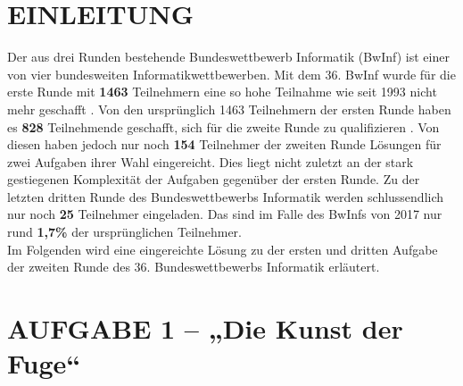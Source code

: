 \documentclass[a4paper,12pt]{article}
\begin{document}
\thispagestyle{empty}
\tableofcontents	
\thispagestyle{empty}




\newpage
\setcounter{page}{4}
\section{EINLEITUNG}



Der aus drei Runden bestehende Bundeswettbewerb Informatik (BwInf) ist einer von vier bundesweiten Informatikwettbewerben. Mit dem 36. BwInf wurde für die erste Runde mit \textbf{1463} Teilnehmern eine so hohe Teilnahme wie seit 1993 nicht mehr geschafft \cite{bwinf_runde1_ergebnis}. Von den ursprünglich 1463 Teilnehmern der ersten Runde haben es \textbf{828} Teilnehmende geschafft, sich für die zweite Runde zu qualifizieren \cite{bwinf_runde2_ergebnis}. Von diesen haben jedoch nur noch \textbf{154} Teilnehmer der zweiten Runde Lösungen für zwei Aufgaben ihrer Wahl eingereicht. Dies liegt nicht zuletzt an der stark gestiegenen Komplexität der Aufgaben gegenüber der ersten Runde. Zu der letzten dritten Runde des Bundeswettbewerbs Informatik werden schlussendlich nur noch \textbf{25} Teilnehmer eingeladen. Das sind im Falle des BwInfs von 2017 nur rund \textbf{1,7\%} der ursprünglichen Teilnehmer.
\\[0.4cm]
Im Folgenden wird eine eingereichte Lösung zu der ersten und dritten Aufgabe der zweiten Runde des 36. Bundeswettbewerbs Informatik erläutert.


\newpage
\section{AUFGABE 1 – „Die Kunst der Fuge“}
\end{document}
